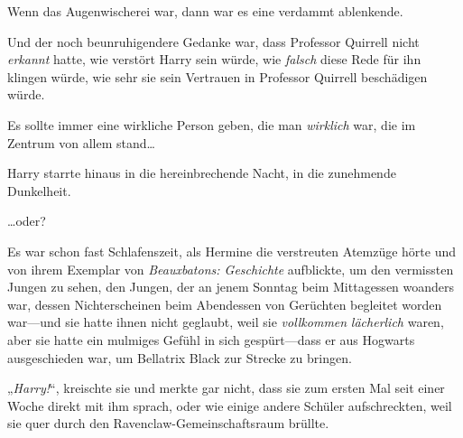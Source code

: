 Wenn das Augenwischerei war, dann war es eine verdammt ablenkende.

Und der noch beunruhigendere Gedanke war, dass Professor Quirrell nicht \emph{erkannt} hatte, wie verstört Harry sein würde, wie \emph{falsch} diese Rede für ihn klingen würde, wie sehr sie sein Vertrauen in Professor Quirrell beschädigen würde.

Es sollte immer eine wirkliche Person geben, die man \emph{wirklich} war, die im Zentrum von allem stand…

Harry starrte hinaus in die hereinbrechende Nacht, in die zunehmende Dunkelheit.

…oder?

\later

Es war schon fast Schlafenszeit, als Hermine die verstreuten Atemzüge hörte und von ihrem Exemplar von \emph{Beauxbatons: Geschichte} aufblickte, um den vermissten Jungen zu sehen, den Jungen, der an jenem Sonntag beim Mittagessen woanders war, dessen Nichterscheinen beim Abendessen von Gerüchten begleitet worden war—und sie hatte ihnen nicht geglaubt, weil sie \emph{vollkommen} \emph{lächerlich} waren, aber sie hatte ein mulmiges Gefühl in sich gespürt—dass er aus Hogwarts ausgeschieden war, um Bellatrix Black zur Strecke zu bringen.

„\emph{Harry!}“, kreischte sie und merkte gar nicht, dass sie zum ersten Mal seit einer Woche direkt mit ihm sprach, oder wie einige andere Schüler aufschreckten, weil sie quer durch den Ravenclaw-Gemeinschaftsraum brüllte.

